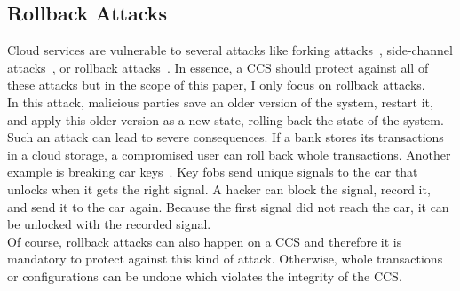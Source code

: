 \subsection{Rollback Attacks}
Cloud services are vulnerable to several attacks like forking attacks~\cite{forkingAttacks}, side-channel attacks~\cite{sideChannel}, or rollback attacks~\cite{Rollback}. In essence, a CCS should protect against all of these attacks but in the scope of this paper, I only focus on rollback attacks.\\
In this attack, malicious parties save an older version of the system, restart it, and apply this older version as a new state, rolling back the state of the system. Such an attack can lead to severe consequences. If a bank stores its transactions in a cloud storage, a compromised user can roll back whole transactions. Another example is breaking car keys~\cite{rolljam}. Key fobs send unique signals to the car that unlocks when it gets the right signal. A hacker can block the signal, record it, and send it to the car again. Because the first signal did not reach the car, it can be unlocked with the recorded signal.\\%
Of course, rollback attacks can also happen on a CCS and therefore it is mandatory to protect against this kind of attack. Otherwise, whole transactions or configurations can be undone which violates the integrity of the CCS.